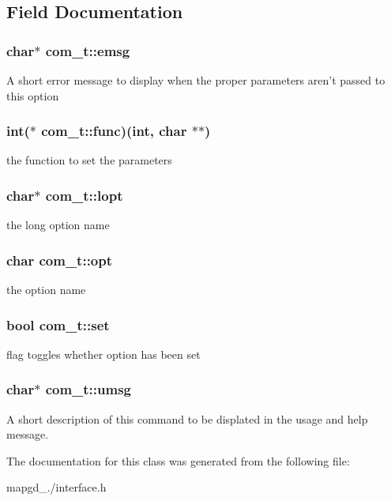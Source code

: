 \subsection{Field Documentation}
\hypertarget{classcom__t_a335660c29bfa0cf5e324a3d54704f351}{
\subsubsection[{emsg}]{\setlength{\rightskip}{0pt plus 5cm}char$\ast$ com\-\_\-t\-::emsg}}\label{classcom__t_a335660c29bfa0cf5e324a3d54704f351}
A short error message to display when the proper parameters aren't passed to this option \hypertarget{classcom__t_a04457e8446cd906b5bed24c43077979d}{
\subsubsection[{func}]{\setlength{\rightskip}{0pt plus 5cm}int($\ast$ com\-\_\-t\-::func)(int, char $\ast$$\ast$)}}\label{classcom__t_a04457e8446cd906b5bed24c43077979d}
the function to set the parameters \hypertarget{classcom__t_a9fc395b3e6669f5370ff4c4281202a9e}{
\subsubsection[{lopt}]{\setlength{\rightskip}{0pt plus 5cm}char$\ast$ com\-\_\-t\-::lopt}}\label{classcom__t_a9fc395b3e6669f5370ff4c4281202a9e}
the long option name \hypertarget{classcom__t_a221c5d1fb0f1d23299526c0efb7c131d}{
\subsubsection[{opt}]{\setlength{\rightskip}{0pt plus 5cm}char com\-\_\-t\-::opt}}\label{classcom__t_a221c5d1fb0f1d23299526c0efb7c131d}
the option name \hypertarget{classcom__t_ae8b6c03d7ec9397c7570295b9f0162fc}{
\subsubsection[{set}]{\setlength{\rightskip}{0pt plus 5cm}bool com\-\_\-t\-::set}}\label{classcom__t_ae8b6c03d7ec9397c7570295b9f0162fc}
flag toggles whether option has been set \hypertarget{classcom__t_a2c4d760c9849ab6c4fd24258ee9bd194}{
\subsubsection[{umsg}]{\setlength{\rightskip}{0pt plus 5cm}char$\ast$ com\-\_\-t\-::umsg}}\label{classcom__t_a2c4d760c9849ab6c4fd24258ee9bd194}
A short description of this command to be displated in the usage and help message. 

The documentation for this class was generated from the following file\-:\begin{DoxyCompactItemize}
\item 
mapgd\-\_./interface.\-h\end{DoxyCompactItemize}
